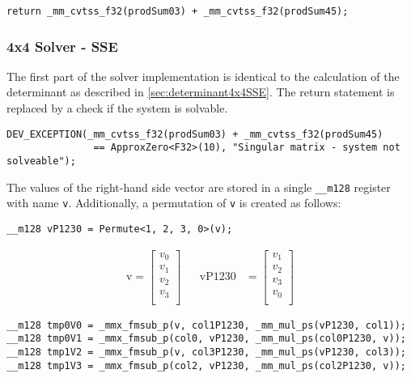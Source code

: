 \documentclass[fontsize = 10pt,DIV = 13]{scrartcl}
\begin{document}
\begin{verbatim}
return _mm_cvtss_f32(prodSum03) + _mm_cvtss_f32(prodSum45);
\end{verbatim}


\subsubsection{4x4 Solver - SSE}

The first part of the solver implementation is identical to the calculation of the determinant as described in \cref{sec:determinant4x4SSE}. The return statement is replaced by a check if the system is solvable.

\begin{verbatim}
DEV_EXCEPTION(_mm_cvtss_f32(prodSum03) + _mm_cvtss_f32(prodSum45) 
               == ApproxZero<F32>(10), "Singular matrix - system not solveable");
\end{verbatim} 

The values of the right-hand side vector are stored in a single \texttt{__m128} register with name \texttt{v}. Additionally, a permutation of \texttt{v} is created as follows:

\begin{verbatim}
__m128 vP1230 = Permute<1, 2, 3, 0>(v);
\end{verbatim}


\begin{align*}
\mathrm{v} 
=
\begin{bmatrix}
v_0\\
v_1\\
v_2\\
v_3\\
\end{bmatrix}
&&
\mathrm{vP1230} 
&=
\begin{bmatrix}
v_1\\
v_2\\
v_3\\
v_0\\
\end{bmatrix}
\end{align*}


\begin{verbatim}
__m128 tmp0V0 = _mmx_fmsub_p(v, col1P1230, _mm_mul_ps(vP1230, col1));
__m128 tmp0V1 = _mmx_fmsub_p(col0, vP1230, _mm_mul_ps(col0P1230, v));
__m128 tmp1V2 = _mmx_fmsub_p(v, col3P1230, _mm_mul_ps(vP1230, col3));
__m128 tmp1V3 = _mmx_fmsub_p(col2, vP1230, _mm_mul_ps(col2P1230, v));
\end{verbatim}
\end{document}
